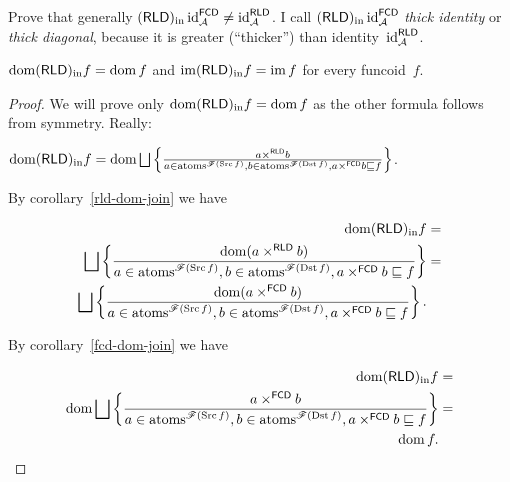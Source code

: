 \begin{xca}
Prove that generally $(\mathsf{RLD})_{\mathrm{in}}\operatorname{id}_{\mathcal{A}}^{\mathsf{FCD}}\ne\operatorname{id}_{\mathcal{A}}^{\mathsf{RLD}}$.
I call $(\mathsf{RLD})_{\mathrm{in}}\operatorname{id}_{\mathcal{A}}^{\mathsf{FCD}}$ \emph{thick identity} or \emph{thick diagonal},
because it is greater (``thicker'') than identity~$\operatorname{id}_{\mathcal{A}}^{\mathsf{RLD}}$.\end{xca}
\begin{prop}
$\operatorname{dom}(\mathsf{RLD})_{\mathrm{in}} f=\operatorname{dom} f$ and $\operatorname{im}(\mathsf{RLD})_{\mathrm{in}} f=\operatorname{im} f$ for every funcoid~$f$.\end{prop}
\begin{proof}
We will prove only $\operatorname{dom}(\mathsf{RLD})_{\mathrm{in}} f=\operatorname{dom} f$ as the other formula follows
from symmetry. Really:

$\dom\torldin f=\dom\bigsqcup\setcond{a\times^{\mathsf{RLD}}b}{a\in\atoms^{\mathscr{F}(\Src f)},b\in\atoms^{\mathscr{F}(\Dst f)},a\times^{\mathsf{FCD}}b\sqsubseteq f}$.

By corollary~\ref{rld-dom-join} we have

\begin{align*}
\dom\torldin f & =\\
\bigsqcup\setcond{\dom(a\times^{\mathsf{RLD}}b)}{a\in\atoms^{\mathscr{F}(\Src f)},b\in\atoms^{\mathscr{F}(\Dst f)},a\times^{\mathsf{FCD}}b\sqsubseteq f} & =\\
\bigsqcup\setcond{\dom(a\times^{\mathsf{FCD}}b)}{a\in\atoms^{\mathscr{F}(\Src f)},b\in\atoms^{\mathscr{F}(\Dst f)},a\times^{\mathsf{FCD}}b\sqsubseteq f}.
\end{align*}


By corollary~\ref{fcd-dom-join} we have

\begin{align*}
\dom\torldin f & =\\
\dom\bigsqcup\setcond{a\times^{\mathsf{FCD}}b}{a\in\atoms^{\mathscr{F}(\Src f)},b\in\atoms^{\mathscr{F}(\Dst f)},a\times^{\mathsf{FCD}}b\sqsubseteq f} & =\\
\dom f.
\end{align*}
\end{proof}

